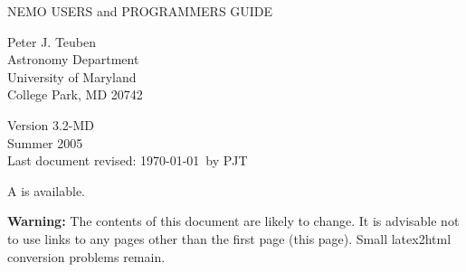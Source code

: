 \newpage
\thispagestyle{empty}
                                                                                        
\begin{flushright}
\vspace*{2.5in}
{\huge NEMO }
\vspace{0.5in}
{\huge USERS and PROGRAMMERS GUIDE}
\vspace{1in}


{\Large
Peter J. Teuben\\
Astronomy Department \\
University of Maryland \\
College Park, MD 20742
}

\vspace{1in}

{\small Version 3.2-MD} \\
{\small Summer 2005} \\
{\small Last document revised: \today\ by PJT} 

\end{flushright}


\setlength{\parindent}{0pt}
\setlength{\parskip}{2.5mm}

%
\begin{htmlonly}
A 
is available. 

{\bf Warning:} The contents of this document are likely to change.
It is advisable not to use links to any pages other than the first
page (this page). Small latex2html conversion problems remain.
\end{htmlonly}

%


\pagestyle{empty}
\newpage

